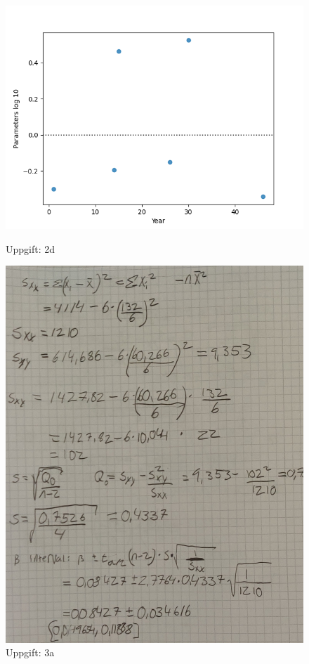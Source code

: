 \documentclass[a4paper]{article}
\begin{document}
            \begin{figure} [h]
                \includegraphics[width=\linewidth]{2d.png}
                \label{fig:rapport}    
                \caption{Uppgift: 2d}
            \end{figure} 

 \begin{figure} [h]
    \includegraphics[width=\linewidth]{3a.jpg}   
    \caption{Uppgift: 3a}
\end{figure}
\end{document}
